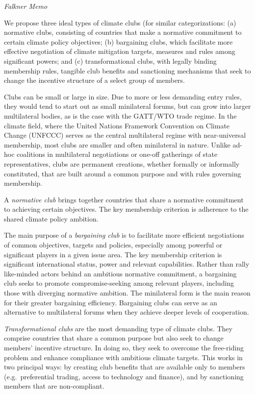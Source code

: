 \documentclass[
]{book}
\begin{document}
\emph{Falkner Memo}

We propose three ideal types of climate clubs (for similar categorizations:
(a) normative clubs, consisting of countries that make a normative commitment to certain climate policy objectives;
(b) bargaining clubs, which facilitate more effective negotiation of climate mitigation targets, measures and rules among significant powers; and
(c) transformational clubs, with legally binding membership rules, tangible club benefits and sanctioning mechanisms that seek to change the incentive structure of a select group of members.

Clubs can be small or large in size. Due to more or less demanding entry rules, they would tend to start out as small minilateral forums, but can grow into larger multilateral bodies, as is the case with the GATT/WTO trade regime. In the climate field, where the United Nations Framework Convention on Climate Change (UNFCCC) serves as the central multilateral regime with near-universal membership, most clubs are smaller and often minilateral in nature. Unlike ad-hoc coalitions in multilateral negotiations or one-off gatherings of state representatives, clubs are permanent creations, whether formally or informally constituted, that are built around a common purpose and with rules governing membership.

A \emph{normative club} brings together countries that share a normative commitment to achieving certain objectives. The key membership criterion is adherence to the shared climate policy ambition.

The main purpose of a \emph{bargaining club} is to facilitate more efficient negotiations of common objectives, targets and policies, especially among powerful or significant players in a given issue area. The key membership criterion is significant international status, power and relevant capabilities.
Rather than rally like-minded actors behind an ambitious normative commitment, a bargaining club seeks to promote compromise-seeking among relevant players, including those with diverging normative ambition. The minilateral form is the main reason for their greater bargaining efficiency.
Bargaining clubs can serve as an alternative to multilateral forums when they achieve deeper levels of cooperation.

\emph{Transformational clubs} are the most demanding type of climate clubs. They comprise countries that share a common purpose but also seek to change members' incentive structure. In doing so, they seek to overcome the free-riding problem and enhance compliance with ambitious climate targets. This works in two principal ways: by creating club benefits that are available only to members (e.g.~preferential trading, access to technology and finance), and by sanctioning members that are non-compliant.
\end{document}

